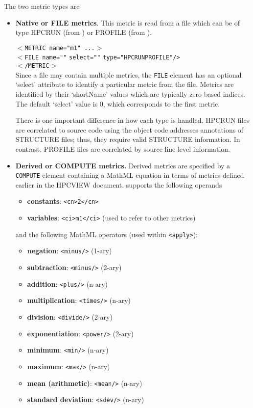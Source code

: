 \documentclass[english]{article}
\begin{document}
\begin{itemize}
The two metric types are
  \begin{itemize}
  \item \textbf{Native or FILE metrics}.  This metric is read from a file which can be of type HPCRUN (from ) or PROFILE (from ).

  \texttt{$<$METRIC name="m1" ...$>$}\\
  \texttt{$<$FILE name="}\texttt{"}
    \texttt{select="}\texttt{"}
    \texttt{type="}\texttt{HPCRUN\Bar PROFILE}\texttt{"/>}\\
  \texttt{$<$/METRIC$>$}\\

   Since a file may contain multiple metrics, the \texttt{FILE} element has an optional `select' attribute to identify a particular metric from the file.  Metrics are identified by their `shortName' values which are typically zero-based indices.  The default `select' value is 0, which corresponds to the first metric.

There is one important difference in how each type is handled.  HPCRUN files are correlated to source code using the object code addresses annotations of STRUCTURE files; thus, they require valid STRUCTURE information.  In contrast, PROFILE files are correlated by source line level information.

  \item \textbf{Derived or COMPUTE metrics.} Derived metrics are specified by a \texttt{COMPUTE} element containing a MathML equation in terms of metrics defined earlier in the HPCVIEW document.   supports the following operands
  \begin{itemize}
    \item \textbf{constants}: \verb+<cn>2</cn>+
    \item \textbf{variables}: \verb+<ci>m1</ci>+ (used to refer to other metrics)
  \end{itemize}
and the following MathML operators (used within \verb+<apply>+):
  \begin{itemize}
    \item \textbf{negation}: \verb+<minus/>+ (1-ary)
    \item \textbf{subtraction}: \verb+<minus/>+ (2-ary)
    \item \textbf{addition}: \verb+<plus/>+ (n-ary)
    \item \textbf{multiplication}: \verb+<times/>+ (n-ary)
    \item \textbf{division}: \verb+<divide/>+ (2-ary)
    \item \textbf{exponentiation}: \verb+<power/>+ (2-ary)
    \item \textbf{minimum}: \verb+<min/>+ (n-ary)
    \item \textbf{maximum}: \verb+<max/>+ (n-ary)
    \item \textbf{mean (arithmetic)}: \verb+<mean/>+ (n-ary)
    \item \textbf{standard deviation}: \verb+<sdev/>+ (n-ary)
  \end{itemize}


\end{itemize}
\end{itemize}
\end{document}
